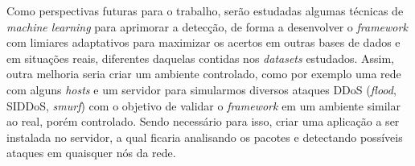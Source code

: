 Como perspectivas futuras para o trabalho, serão estudadas algumas técnicas de \textit{machine learning}  para aprimorar a detecção, de forma a desenvolver o \textit{framework} com limiares adaptativos para maximizar os acertos em outras bases de dados e em situações reais, diferentes daquelas contidas nos \textit{datasets} estudados. Assim, outra melhoria seria criar um ambiente controlado, como por exemplo uma rede com alguns \textit{hosts} e um servidor para simularmos diversos ataques DDoS (\textit{flood}, SIDDoS, \textit{smurf}) com o objetivo de validar o \textit{framework} em um ambiente similar ao real, porém controlado. Sendo necessário para isso, criar uma aplicação a ser instalada no servidor, a qual ficaria analisando os pacotes e detectando possíveis ataques em quaisquer nós da rede.


